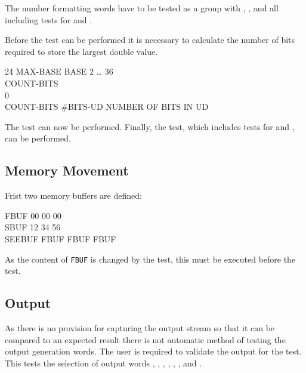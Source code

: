 The number formatting words have to be tested as a group with
	,
	, and
	 all including tests for
	 and .

Before the  test can be performed it is
necessary to calculate the number of bits required to store the
largest double value.

\begin{tt}
24  MAX-BASE							\tab[7.6]  BASE 2 {\ldots} 36 \\
\word{:} COUNT-BITS \\
 0 
	       
	 \word{;} \\
COUNT-BITS   \#BITS-UD		\tab {} NUMBER OF BITS IN UD
\end{tt}

The  test can now be performed.
Finally, the  test, which includes tests for
 and , can be performed.

\subsection{Memory Movement}

Frist two memory buffers are defined:

\begin{tt}
 FBUF 00  00  00  \\
 SBUF 12  34  56  \\
\word{:} SEEBUF FBUF   FBUF    FBUF    \word{;}
\end{tt}

As the content of \texttt{FBUF} is changed by the
 test, this must be executed before the
 test.

\subsection{Output}

As there is no provision for capturing the output stream so that it
can be compared to an expected result there is not automatic method
of testing the output generation words.  The user is required to
validate the output for the  test.  This tests
the selection of output words , , ,
, , , and .

